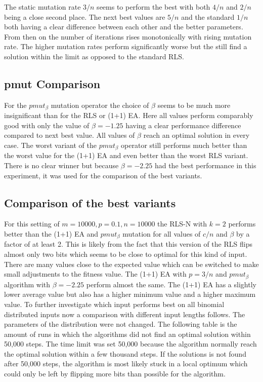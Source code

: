 

The static mutation rate $3/n$ seems to perform the best with both $4/n$ and $2/n$ being a close second place.
The next best values are $5/n$ and the standard $1/n$ both having a clear difference between each other and the better parameters.
From then on the number of iterations rises monotonically with rising mutation rate.
The higher mutation rates perform significantly worse but the still find a solution within the limit as opposed to the standard RLS.
\subsection{pmut Comparison}




For the $pmut_\beta$ mutation operator the choice of $\beta$ seems to be much more insignificant than for the RLS or (1+1) EA. Here all values perform comparably good with only the value of $\beta = -1.25$ having a clear performance difference compared to next best value. All values of $\beta$ reach an optimal solution in every case. The worst variant of the $pmut_\beta$ operator still performs much better than the worst value for the (1+1) EA and even better than the worst RLS variant. There is no clear winner but because $\beta=-2.25$ had the best performance in this experiment, it was used for the comparison of the best variants.
\subsection{Comparison of the best variants}




For this setting of $m=10000, p=0.1, n=10000$ the RLS-N with $k=2$ performs better than the  (1+1) EA and $pmut_\beta$ mutation for all values of $c/n$ and $\beta$ by a factor of at least 2.
This is likely from the fact that this version of the RLS flips almost only two bits which seems to be close to optimal for this kind of input.
There are many values close to the expected value which can be switched to make small adjustments to the fitness value.
The (1+1) EA with $p=3/n$ and $pmut_\beta$ algorithm with $\beta=-2.25$ perform almost the same.
The (1+1) EA has a slightly lower average value but also has a higher minimum value and a higher maximum value.
To further investigate which input performs best on all binomial distributed inputs now a comparison with different input lengths follows.
The parameters of the distribution were not changed.\newline
The following table is the amount of runs in which the algorithms did not find an optimal solution within 50,000 steps.
The time limit was set 50,000 because the algorithm normally reach the optimal solution within a few thousand steps.
If the solutions is not found after 50,000 steps, the algorithm is most likely stuck in a local optimum which could only be left by flipping more bits than possible for the algorithm.


